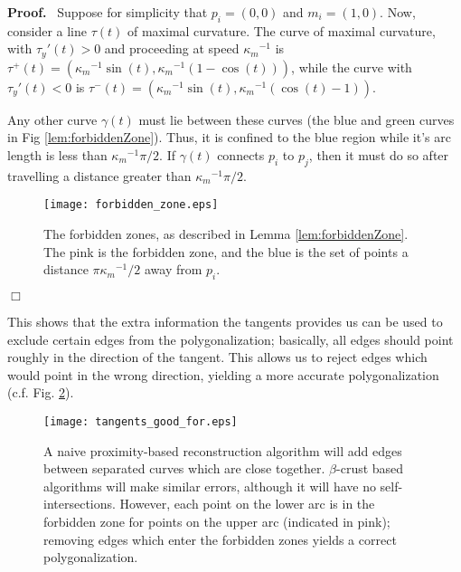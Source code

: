 \documentclass{article}
\newenvironment{proof}{
  \noindent\textbf{Proof.}\ }{\hspace*{\fill}
  \begin{math}\Box\end{math}\medskip}
\numberwithin{cntr}{section}
\numberwithin{equation}{section}
\newcommand{\kmax}{{\kappa_{m}}}
\newcommand{\kmaxi}{{\kmax^{-1}}}
\begin{document}
\begin{proof}
  Suppose for simplicity that $p_{i}=(0,0)$ and $m_{i}=(1,0)$. Now, consider a line $\tau(t)$ of maximal curvature. The curve of maximal curvature, with $\tau_{y}'(t) > 0$ and proceeding at speed $\kmaxi$ is $\tau^{+}(t)=(\kmaxi \sin(t), \kmaxi (1-\cos(t)))$, while the curve with $\tau_{y}'(t) < 0$ is $\tau^{-}(t)=(\kmaxi \sin(t), \kmaxi (\cos(t)-1))$.

Any other curve $\gamma(t)$ must lie between these curves (the blue and green curves in Fig \ref{lem:forbiddenZone}). Thus, it is confined to the blue region while it's arc length is less than $\kmaxi \pi/2$. If $\gamma(t)$ connects $p_{i}$ to $p_{j}$, then it must do so after travelling a distance greater than $\kmaxi \pi/2$.

\begin{figure}
\setlength{\unitlength}{0.240900pt}
\ifx\plotpoint\undefined\newsavebox{\plotpoint}\fi
\sbox{\plotpoint}{\rule[-0.200pt]{0.400pt}{0.400pt}}%
\texttt{[image: forbidden\_zone.eps]}

\caption{The forbidden zones, as described in Lemma \ref{lem:forbiddenZone}. The pink is the forbidden zone, and the blue is the set of points a distance $\pi \kmaxi/2$ away from $p_{i}$.}
\label{fig:forbiddenZone}
\end{figure}
\end{proof}

This shows that the extra information the tangents provides us can be used to exclude certain edges from the polygonalization; basically, all edges should point roughly in the direction of the tangent. This allows us to reject edges which would point in the wrong direction, yielding a more accurate polygonalization (c.f. Fig. \ref{fig:proximityVsTangentBased}).

\begin{figure}
\setlength{\unitlength}{0.240900pt}
\ifx\plotpoint\undefined\newsavebox{\plotpoint}\fi
\sbox{\plotpoint}{\rule[-0.200pt]{0.400pt}{0.400pt}}%
\texttt{[image: tangents\_good\_for.eps]}

\caption{A naive proximity-based reconstruction algorithm will add edges between separated curves which are close together. $\beta$-crust based algorithms will make similar errors, although it will have no self-intersections. However, each point on the lower arc is in the forbidden zone for points on the upper arc (indicated in pink); removing edges which enter the forbidden zones yields a correct polygonalization. }
\label{fig:proximityVsTangentBased}
\end{figure}




\end{document}
